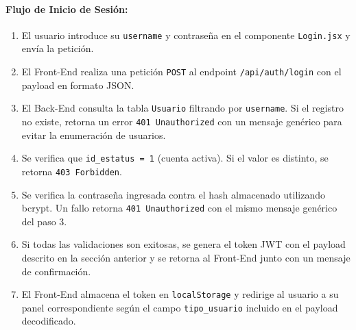 \paragraph{Flujo de Inicio de Sesión:}
\begin{enumerate}
    \item El usuario introduce su \texttt{username} y contraseña en el
    componente \texttt{Login.jsx} y envía la petición.
    \item El Front-End realiza una petición \texttt{POST} al endpoint
    \texttt{/api/auth/login} con el payload en formato JSON.
    \item El Back-End consulta la tabla \texttt{Usuario} filtrando por
    \texttt{username}. Si el registro no existe, retorna un error
    \texttt{401 Unauthorized} con un mensaje genérico para evitar la
    enumeración de usuarios.
    \item Se verifica que \texttt{id\_estatus = 1} (cuenta activa). Si
    el valor es distinto, se retorna \texttt{403 Forbidden}.
    \item Se verifica la contraseña ingresada contra el hash almacenado
    utilizando bcrypt. Un fallo retorna \texttt{401 Unauthorized} con
    el mismo mensaje genérico del paso 3.
    \item Si todas las validaciones son exitosas, se genera el token JWT
    con el payload descrito en la sección anterior y se retorna al
    Front-End junto con un mensaje de confirmación.
    \item El Front-End almacena el token en \texttt{localStorage} y
    redirige al usuario a su panel correspondiente según el campo
    \texttt{tipo\_usuario} incluido en el payload decodificado.
\end{enumerate}
 
